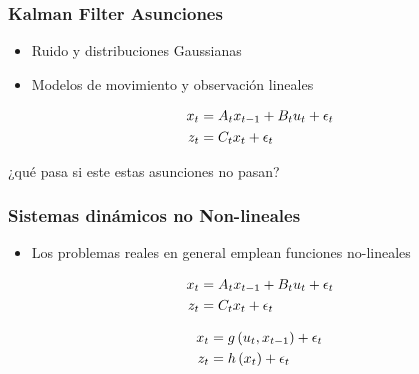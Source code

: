 \begin{frame}
	\frametitle{Kalman Filter Asunciones}
	
	\begin{itemize}
		\item Ruido y distribuciones Gaussianas
		\item Modelos de movimiento y observación lineales
	\end{itemize}

	\begin{align*}
		x_{t} &= A_{t} x_{t-1} + B_{t}u_{t} + \epsilon_{t}\\
		z_{t} &= C_{t} x_{t} + \epsilon_{t}
	\end{align*}

	\centering
	\alert{¿qué pasa si este estas asunciones no pasan?}
\end{frame}

\begin{frame}
	\frametitle{Sistemas dinámicos no Non-lineales}
	\begin{itemize}
		\item Los problemas reales en general emplean funciones no-lineales
	\end{itemize}
	
	\begin{align*}
		x_{t} &= A_{t} x_{t-1} + B_{t}u_{t} + \epsilon_{t}\\
		z_{t} &= C_{t} x_{t} + \epsilon_{t}
	\end{align*}


	\begin{align*}
		x_{t} &= g\left( u_{t}, x_{t-1} \right) + \epsilon_{t}\\
		z_{t} &= h\left( x_{t} \right) + \epsilon_{t}
	\end{align*}

\end{frame}

